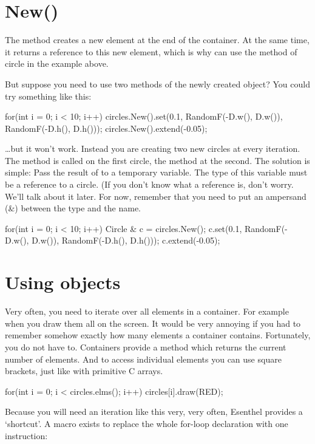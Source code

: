 \section{New()}
The method  creates a new element at the end of the container. At the same time, it returns a reference to this new element, which is why can use the  method of circle in the example above. 

But suppose you need to use two methods of the newly created object? You could try something like this:

\begin{code}
for(int i = 0; i < 10; i++)
{
	circles.New().set(0.1, RandomF(-D.w(), D.w()), RandomF(-D.h(), D.h()));
	circles.New().extend(-0.05);
}
\end{code}

\ldots but it won't work. Instead you are creating two new circles at every iteration. The method  is called on the first circle, the method  at the second. The solution is simple: Pass the result of  to a temporary variable. The type of this variable must be a reference to a circle. (If you don't know what a reference is, don't worry. We'll talk about it later. For now, remember that you need to put an ampersand (\&) between the type and the name.

\begin{code}
for(int i = 0; i < 10; i++)
{
	Circle & c = circles.New();
	c.set(0.1, RandomF(-D.w(), D.w()), RandomF(-D.h(), D.h()));
	c.extend(-0.05);
}
\end{code}

\section{Using objects}
Very often, you need to iterate over all elements in a container. For example when you draw them all on the screen. It would be very annoying if you had to remember somehow exactly how many elements a container contains. Fortunately, you do not have to. Containers provide a method  which returns the current number of elements. And to access individual elements you can use square brackets, just like with primitive C arrays.

\begin{code}
for(int i = 0; i < circles.elms(); i++)
{
  circles[i].draw(RED);
}
\end{code}

Because you will need an iteration like this very, very often, Esenthel provides a `shortcut'. A macro  exists to replace the whole for-loop declaration with one instruction:


